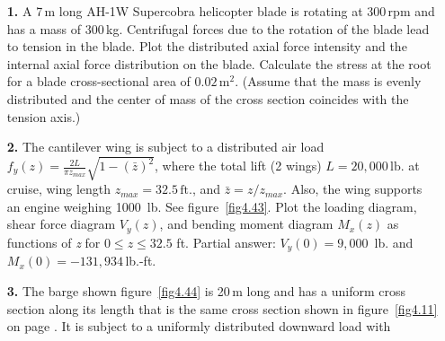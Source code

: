 \documentclass{AeroStructure-ERJohnson}
\begin{document}
\begin{exercise}
\begin{enumerate}[\textbf{2.}]
\item[\textbf{1.}] A 7\,m long AH-1W Supercobra helicopter blade is rotating at 300\,rpm and has a mass of 300\,kg. Centrifugal forces due to the rotation of the blade lead to tension in the blade. Plot the distributed axial force intensity and the internal axial force distribution on the blade. Calculate the stress at the root for a blade cross-sectional area of $0.02\,\textrm{m}^2$. (Assume that the mass is evenly distributed and the center of mass of the cross section coincides with the tension axis.)

\item[\textbf{2.}] The cantilever wing is subject to a distributed air load $f_{y}(z)=\frac{2 L}{\pi z_{\textit{max}}} \sqrt{1-(\bar{z})^{2}}$, where the total lift (2 wings) $L=20{,}000\,\textrm{lb.}$ at cruise, wing length $z_{\textit{max}}=32.5\,\textrm{ft.}$, and ${\bar{z}}=z/z_{\textit{max}}$. Also, the wing supports an engine weighing 1000~lb. See figure~\ref{fig4.43}. Plot the loading diagram, shear force diagram $V_{y}(z)$, and bending moment diagram $M_{x}(z)$ as functions of \textit{z} for $0\leq z \leq 32.5$ ft. Partial answer: $V_{y}(0) = 9{,}000$~lb. and $M_{x}(0)= -131{,}934$\,lb.-ft.\vspace*{-6pt}

{\def\thefigure{4.43}
}

\vspace*{-13pt}

\item[\textbf{3.}] The barge shown figure~\ref{fig4.44} is 20\,m long and has a uniform cross section along its length that is the same cross section shown in figure~\ref{fig4.11} on page \pageref{fig4.11}. It is subject to a uniformly distributed downward load with{\parfillskip=0pt\par}\vspace*{-6pt}


\end{enumerate}
\end{exercise}
\end{document}
